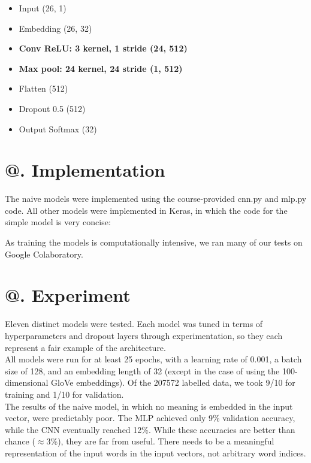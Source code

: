 \documentclass[jou,apacite, 10px]{apa6}
\makeatletter
\newcommand*{\rom}[1]{\expandafter\@slowromancap\romannumeral #1@}
\makeatother
\begin{document}
\begin{itemize}
    \item Input (26, 1)
    \item Embedding (26, 32)
    \item \textbf{Conv ReLU: 3 kernel, 1 stride (24, 512)}
    \item \textbf{Max pool: 24 kernel, 24 stride (1, 512)}
    \item Flatten (512)
    \item Dropout 0.5 (512)
    \item Output Softmax (32)\\
\end{itemize}

\section{\rom{4}. Implementation}

The naive models were implemented using the course-provided cnn.py and mlp.py code. All other models were implemented in Keras, in which the code for the simple model is very concise:\\



\rule{0pt}{4ex} As training the models is computationally intensive, we ran many of our tests on Google Colaboratory.\\

\section{\rom{5}. Experiment}
Eleven distinct models were tested. Each model was tuned in terms of hyperparameters and dropout layers through experimentation, so they each represent a fair example of the architecture.\\

All models were run for at least 25 epochs, with a learning rate of 0.001, a batch size of 128, and an embedding length of 32 (except in the case of using the 100-dimensional GloVe embeddings). Of the 207572 labelled data, we took 9/10 for training and 1/10 for validation.\\

The results of the naive model, in which no meaning is embedded in the input vector, were predictably poor. The MLP achieved only 9\% validation accuracy, while the CNN eventually reached 12\%. While these accuracies are better than chance ($\approx$3\%), they are far from useful. There needs to be a meaningful representation of the input words in the input vectors, not arbitrary word indices.\\
\end{document}
